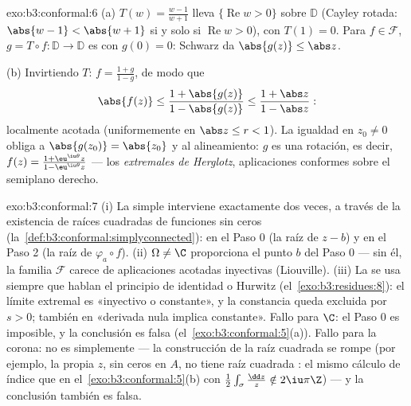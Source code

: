 \begin{solution}{exo:b3:conformal:6}
(a) $T(w) = \frac{w - 1}{w + 1}$ lleva $\{\operatorname{Re}w >
0\}$  sobre
$\mathbb D$ (Cayley rotada: $\abs{w -
1} < \abs{w + 1}$ si y solo si $\operatorname{Re}w > 0$), con $T(1) =
0$. Para $f \in \mathcal F$, $g = T\circ f\colon \mathbb D \to
\mathbb D$ es  con
$g(0) = 0$: Schwarz da
$\abs{g(z)} \leq \abs z$.

(b) Invirtiendo $T$: $f = \frac{1 + g}{1 - g}$, de modo que
\[
\abs{f(z)} \leq \frac{1 + \abs{g(z)}}{1 - \abs{g(z)}}
\leq \frac{1 + \abs z}{1 - \abs z} :
\]
localmente acotada (uniformemente en $\abs z \leq r < 1$). La igualdad
en $z_0 \neq 0$ obliga a $\abs{g(z_0)} = \abs{z_0}$ y al alineamiento:
$g$ es una rotación, es decir, $f(z) = \frac{1 +
\eu^{\iu\theta}z}{1 - \eu^{\iu\theta}z}$ --- los \emph{extremales de
Herglotz}, aplicaciones conformes
sobre el semiplano derecho.
\end{solution}

\begin{solution}{exo:b3:conformal:7}
(i) La  simple interviene exactamente dos veces, a través de la
existencia de raíces cuadradas
 de funciones sin ceros
(la~\cref{def:b3:conformal:simplyconnected}): en el Paso 0 (la raíz de
$z - b$) y en el Paso 2 (la raíz de $\varphi_a\circ f$). (ii)
$\Omega \neq \C$ proporciona el punto $b$ del Paso 0 --- sin él, la
familia $\mathcal F$ carece de aplicaciones acotadas inyectivas
(Liouville). (iii) La  se
usa siempre que hablan el principio de identidad o Hurwitz
(el~\cref{exo:b3:residues:8}): el límite extremal es «inyectivo o
constante», y la constancia queda excluida por $s > 0$; también en
«derivada nula implica constante». Fallo para $\C$: el Paso 0 es
imposible, y la conclusión es falsa (el~\cref{exo:b3:conformal:5}(a)).
Fallo para la corona: no es
simplemente  --- la
construcción de la raíz cuadrada se rompe (por ejemplo, la propia $z$,
sin ceros en $A$, no tiene raíz cuadrada
: el mismo cálculo de índice
que en el~\cref{exo:b3:conformal:5}(b) con
$\frac12\int_\sigma\frac{\dd z}z \notin 2\iu\pi\Z$) --- y la conclusión
también es falsa.
\end{solution}

